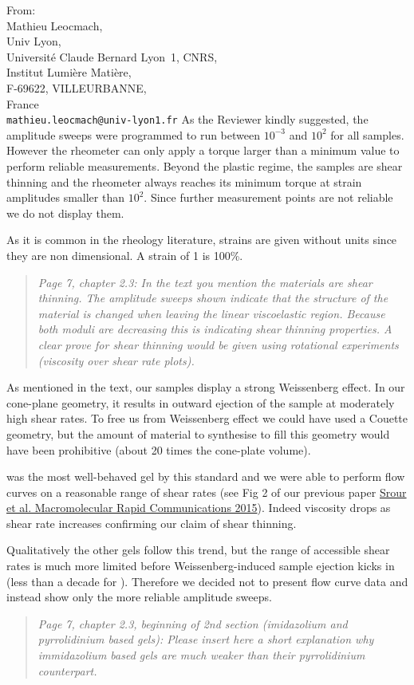 \documentclass[a4paper, parskip=true, firsthead=false, fromemail=true, foldmarks=false]{scrlttr2}
\newenvironment{quotationi}
{\begin{quotation}\itshape}
{\end{quotation}}
\begin{document}
\begin{letter}{From:\\
Mathieu Leocmach,\\
Univ Lyon,\\ 
Universit\'e Claude Bernard Lyon~1, CNRS,\\
Institut Lumi\`ere Mati\`ere,\\
F-69622, VILLEURBANNE,\\
France\\
\texttt{mathieu.leocmach@univ-lyon1.fr}
}
As the Reviewer kindly suggested, the amplitude sweeps were programmed to run between $10^{-3}$ and $10^2$ for all samples. However the rheometer can only apply a torque larger than a minimum value to perform reliable measurements. Beyond the plastic regime, the samples are shear thinning and the rheometer always reaches its minimum torque at strain amplitudes smaller than $10^2$. Since further measurement points are not reliable we do not display them.

As it is common in the rheology literature, strains are given without units since they are non dimensional. A strain of 1 is 100\%.

\begin{quotationi}
Page 7, chapter 2.3: In the text you mention the materials are shear thinning. The amplitude sweeps shown indicate that the structure of the material is changed when leaving the linear viscoelastic region. Because both moduli are decreasing this is indicating shear thinning properties. A clear prove for shear thinning would be given using rotational experiments (viscosity over shear rate plots).
\end{quotationi}

As mentioned in the text, our samples display a strong Weissenberg effect. In our cone-plane geometry, it results in outward ejection of the sample at moderately high shear rates. To free us from Weissenberg effect we could have used a Couette geometry, but the amount of material to synthesise to fill this geometry would have been prohibitive (about 20 times the cone-plate volume).

 was the most well-behaved gel by this standard and we were able to perform flow curves on a reasonable range of shear rates (see Fig 2 of our previous paper \href{http://doi.org/10.1002/marc.201400478}{Srour et al. Macromolecular Rapid Communications 2015}). Indeed viscosity drops as shear rate increases confirming our claim of shear thinning.

Qualitatively the other gels follow this trend, but the range of accessible shear rates is much more limited before Weissenberg-induced sample ejection kicks in (less than a decade for ). Therefore we decided not to present flow curve data and instead show only the more reliable amplitude sweeps.



\begin{quotationi}
Page 7, chapter 2.3, beginning of 2nd section (imidazolium and pyrrolidinium based gels): Please insert here a short explanation why immidazolium based gels are much weaker than their pyrrolidinium counterpart.
\end{quotationi}


\end{letter}
\end{document}

